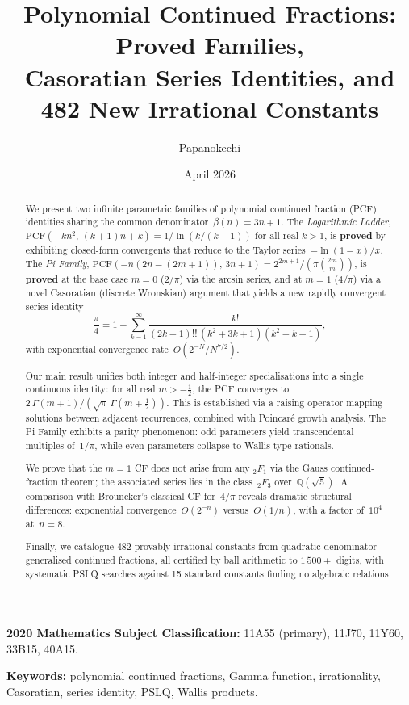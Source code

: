 \documentclass[11pt,a4paper]{article}
\title{Polynomial Continued Fractions: Proved Families,\\
Casoratian Series Identities, and 482 New Irrational Constants}
\author{Papanokechi}
\date{April 2026}
\theoremstyle{plain}
\theoremstyle{definition}
\theoremstyle{remark}
\newcommand{\PCF}{\mathrm{PCF}}
\newcommand{\half}{\tfrac{1}{2}}
\newcommand{\dff}[1]{(#1)!!}
\begin{document}
\maketitle

\begin{abstract}
We present two infinite parametric families of polynomial continued fraction
(PCF) identities sharing the common denominator~$\beta(n) = 3n{+}1$.
The \emph{Logarithmic Ladder},
$\PCF(-kn^2,\,(k{+}1)n{+}k) = 1/\ln(k/(k{-}1))$
for all real $k > 1$,
is \textbf{proved} by exhibiting closed-form convergents that reduce to
the Taylor series~$-\ln(1{-}x)/x$.
The \emph{Pi Family},
$\PCF(-n(2n{-}(2m{+}1)),\,3n{+}1) = 2^{2m+1}/(\pi\binom{2m}{m})$,
is \textbf{proved} at the base case $m=0$ ($2/\pi$) via the arcsin series,
and at $m=1$ ($4/\pi$) via a novel Casoratian (discrete Wronskian) argument
that yields a new rapidly convergent series identity
\[
  \frac{\pi}{4} = 1 - \sum_{k=1}^{\infty}
  \frac{k!}{\dff{2k{-}1}\,(k^2{+}3k{+}1)(k^2{+}k{-}1)},
\]
with exponential convergence rate~$O(2^{-N}/N^{7/2})$.

Our main result unifies both integer and half-integer specialisations into
a single continuous identity: for all real $m > -\frac{1}{2}$, the PCF
converges to $2\,\Gamma(m{+}1)/(\sqrt{\pi}\,\Gamma(m{+}\half))$.
This is established via a raising operator mapping solutions between
adjacent recurrences, combined with Poincar\'e growth analysis.
The Pi Family exhibits a parity phenomenon: odd parameters yield
transcendental multiples of~$1/\pi$, while even parameters collapse
to Wallis-type rationals.

We prove that the $m=1$ CF does not arise from any ${}_2F_1$ via the Gauss
continued-fraction theorem; the associated series lies in the
class~${}_2F_3$ over~$\mathbb{Q}(\sqrt{5})$.
A comparison with Brouncker's classical CF for~$4/\pi$ reveals dramatic
structural differences: exponential convergence~$O(2^{-n})$
versus~$O(1/n)$, with a factor of~$10^4$ at~$n=8$.

Finally, we catalogue 482 provably irrational constants from
quadratic-denominator generalised continued fractions, all certified
by ball arithmetic to $1\,500{+}$ digits, with systematic PSLQ searches
against 15 standard constants finding no algebraic relations.
\end{abstract}

\noindent
\textbf{2020 Mathematics Subject Classification:}
11A55 (primary), 11J70, 11Y60, 33B15, 40A15.

\noindent
\textbf{Keywords:}
polynomial continued fractions, Gamma function, irrationality,
Casoratian, series identity, PSLQ, Wallis products.
\end{document}
